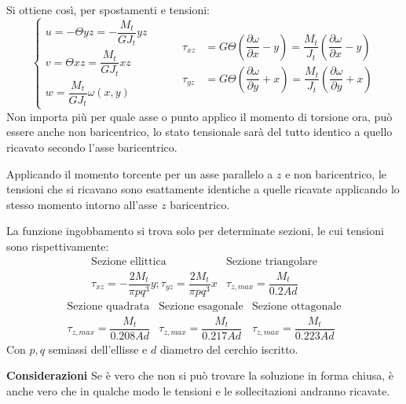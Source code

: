 \documentclass{article}
\begin{document}
\begin{adjustwidth}{2in}{}
		Si ottiene così, per spostamenti e tensioni: 
			\[ \begin{cases}
			u = -\Theta yz = -\dfrac{M_t}{GJ_t}yz \\
			v =  \Theta xz = \dfrac{M_t}{GJ_t}xz\\
			w = \dfrac{M_t}{GJ_t}\omega(x,y)
		\end{cases} \hspace{1cm} \begin{aligned}
		\tau_{xz} &= G\Theta \left(\dfrac{\partial \omega}{\partial x}-y\right) =\dfrac{M_t}{J_t}  \left(\dfrac{\partial \omega}{\partial x}-y\right) \\
		\tau_{yz} &= G \Theta \left(\dfrac{\partial \omega}{\partial y} + x\right) = \dfrac{M_t}{J_t} \left(\dfrac{\partial \omega}{\partial y} + x\right)
	\end{aligned}\]
	Non importa più per quale asse o punto applico il momento di torsione ora, può essere anche non baricentrico, lo stato tensionale sarà del tutto identico a quello ricavato secondo l'asse baricentrico. 
	
	Applicando il momento torcente per un asse parallelo a $z$ e non baricentrico, le tensioni che si ricavano sono esattamente identiche a quelle ricavate applicando lo stesso momento intorno all'asse $z$ baricentrico. \newline 
	
	La funzione ingobbamento si trova solo per determinate sezioni, le cui tensioni sono rispettivamente: 
	\[\begin{array}{cc}
		\text{Sezione ellittica} & \text{Sezione triangolare} \\ 
		\tau_{xz} = -\dfrac{2M_t}{\pi pq^3}y; \tau_{yz} = \dfrac{2M_t}{\pi pq^3}x  & \tau_{z, max} = \dfrac{M_t}{0.2Ad}  
	\end{array}\]
   \[\begin{array}{ccc}
   	\text{Sezione quadrata} & \text{Sezione esagonale} & \text{Sezione ottagonale} \\
   	\tau_{z, max} = \dfrac{M_t}{0.208Ad} & \tau_{z, max} = \dfrac{M_t}{0.217Ad} & \tau_{z, max} = \dfrac{M_t}{0.223Ad}
   \end{array}\]
			Con $p,q$ semiassi dell'ellisse e $d$ diametro del cerchio iscritto. \newline 
			
			\textbf{Considerazioni}\newline 
			Se è vero che non si può trovare la soluzione in forma chiusa, è anche vero che in qualche modo le tensioni e le sollecitazioni andranno ricavate. 
			

\end{adjustwidth}
\end{document}
